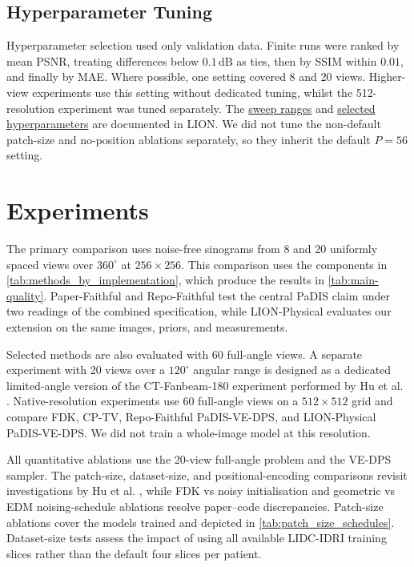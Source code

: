 \subsection{Hyperparameter Tuning}
Hyperparameter selection used only validation data. Finite runs were ranked by mean PSNR, treating differences below $0.1\,\mathrm{dB}$ as ties, then by SSIM within $0.01$, and finally by MAE. Where possible, one setting covered 8 and 20 views. Higher-view experiments use this setting without dedicated tuning, whilst the 512-resolution experiment was tuned separately. The \href{https://github.com/THartigan/MPhil-Project/blob/main/LION/scripts/paper_scripts/PaDIS-Reproduction/tuning/TUNING.md\#attempted-values}{sweep ranges} and \href{https://github.com/THartigan/MPhil-Project/blob/main/LION/scripts/paper_scripts/PaDIS-Reproduction/README.md\#tuned-reconstruction-defaults}{selected hyperparameters} are documented in LION. We did not tune the non-default patch-size and no-position ablations separately, so they inherit the default $P=56$ setting.

\section{Experiments}

The primary comparison uses noise-free sinograms from 8 and 20 uniformly spaced views over $360^\circ$ at $256\times256$. This comparison uses the components in \autoref{tab:methods_by_implementation}, which produce the results in \autoref{tab:main-quality}. Paper-Faithful and Repo-Faithful test the central PaDIS claim under two readings of the combined specification, while LION-Physical evaluates our extension on the same images, priors, and measurements.

Selected methods are also evaluated with 60 full-angle views. A separate experiment with 20 views over a $120^\circ$ angular range is designed as a dedicated limited-angle version of the CT-Fanbeam-180 experiment performed by Hu et al. \cite{hu_learning_2024}. Native-resolution experiments use 60 full-angle views on a $512\times512$ grid and compare FDK, CP-TV, Repo-Faithful PaDIS-VE-DPS, and LION-Physical PaDIS-VE-DPS. We did not train a whole-image model at this resolution.

All quantitative ablations use the 20-view full-angle problem and the VE-DPS sampler. The patch-size, dataset-size, and positional-encoding comparisons revisit investigations by Hu et al. \cite{hu_learning_2024}, while FDK vs noisy initialisation and geometric vs EDM noising-schedule ablations resolve paper--code discrepancies. Patch-size ablations cover the models trained and depicted in \autoref{tab:patch_size_schedules}. Dataset-size tests assess the impact of using all available LIDC-IDRI training slices rather than the default four slices per patient.


